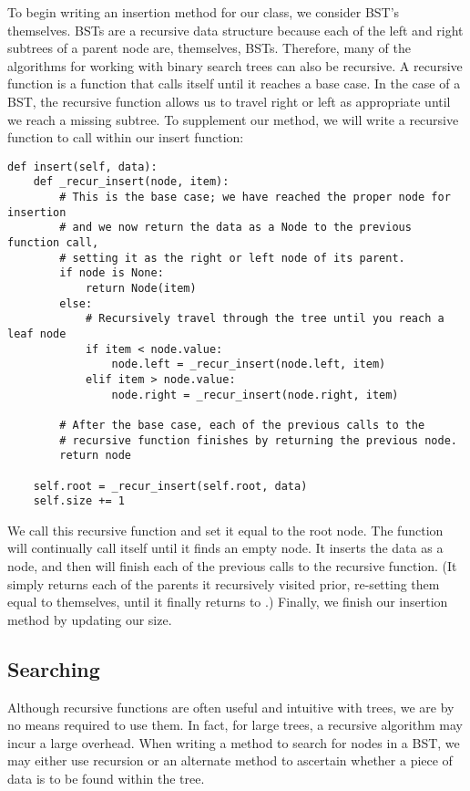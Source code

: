 To begin writing an insertion method for our  class, we consider BST's themselves.
BSTs are a recursive data structure because each of the left and right subtrees of a parent node are, themselves, BSTs.
Therefore, many of the algorithms for working with binary search trees can also be recursive.
A recursive function is a function that calls itself until it reaches a base case.
In the case of a BST, the recursive function allows us to travel right or left as appropriate until we reach a missing subtree.
To supplement our  method, we will write a recursive function to call within our insert function:
\begin{lstlisting}
def insert(self, data):
    def _recur_insert(node, item):
        # This is the base case; we have reached the proper node for insertion
        # and we now return the data as a Node to the previous function call,
        # setting it as the right or left node of its parent.
        if node is None:
            return Node(item)
        else:
            # Recursively travel through the tree until you reach a leaf node
            if item < node.value:
                node.left = _recur_insert(node.left, item)
            elif item > node.value:
                node.right = _recur_insert(node.right, item)

        # After the base case, each of the previous calls to the
        # recursive function finishes by returning the previous node.
        return node

    self.root = _recur_insert(self.root, data)
    self.size += 1
\end{lstlisting}
We call this recursive function and set it equal to the root node.
The function will continually call itself until it finds an empty node.
It inserts the data as a node, and then  will finish each of the previous calls to the recursive function.
(It simply returns each of the parents it recursively visited prior, re-setting them equal to themselves, until it finally returns to .)
Finally, we finish our insertion method by updating our size.

\subsection*{Searching}
Although recursive functions are often useful and intuitive with trees, we are by no means required to use them.
In fact, for large trees, a recursive algorithm may incur a large overhead.
When writing a method to search for nodes in a BST, we may either use recursion or an alternate method to ascertain whether a piece of data is to be found within the tree.

